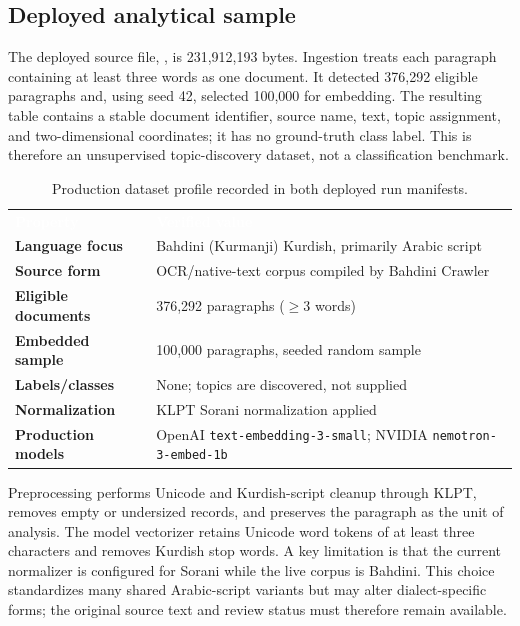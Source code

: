 \documentclass[11pt,a4paper]{article}
\newcommand{\thc}[1]{\textcolor{white}{\textbf{#1}}}
\newcommand{\sourcecode}[1]{\texttt{\detokenize{#1}}}
\begin{document}
\subsection{Deployed analytical sample}

The deployed source file, \sourcecode{corpus_unreviewed.txt}, is 231,912,193
bytes. Ingestion treats each paragraph containing at least three words as one
document. It detected 376,292 eligible paragraphs and, using seed 42, selected
100,000 for embedding. The resulting table contains a stable document
identifier, source name, text, topic assignment, and two-dimensional
coordinates; it has no ground-truth class label. This is therefore an
unsupervised topic-discovery dataset, not a classification benchmark.

\begin{table}[htbp]
\centering
\caption{Production dataset profile recorded in both deployed run manifests.}
\label{tab:dataset}
\small
{}
\begin{tabularx}{\linewidth}{@{}>{\bfseries}p{39mm}Y@{}}
\thc{Property} & \thc{Verified value}\\
Language focus & Bahdini (Kurmanji) Kurdish, primarily Arabic script\\
Source form & OCR/native-text corpus compiled by Bahdini Crawler\\
Eligible documents & 376,292 paragraphs ($\geq 3$ words)\\
Embedded sample & 100,000 paragraphs, seeded random sample\\
Labels/classes & None; topics are discovered, not supplied\\
Normalization & KLPT Sorani normalization applied\\
Production models & OpenAI \texttt{text-embedding-3-small}; NVIDIA \texttt{nemotron-3-embed-1b}\\
\end{tabularx}
\end{table}

Preprocessing performs Unicode and Kurdish-script cleanup through KLPT, removes
empty or undersized records, and preserves the paragraph as the unit of
analysis. The model vectorizer retains Unicode word tokens of at least three
characters and removes Kurdish stop words. A key limitation is that the current
normalizer is configured for Sorani while the live corpus is Bahdini. This
choice standardizes many shared Arabic-script variants but may alter
dialect-specific forms; the original source text and review status must
therefore remain available.
\end{document}
